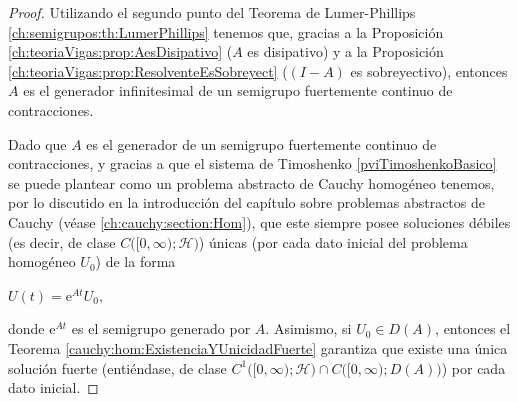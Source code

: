 \begin{proof}
    Utilizando el segundo punto del Teorema de Lumer-Phillips \ref{ch:semigrupos:th:LumerPhillips} tenemos que, gracias a la Proposición \ref{ch:teoriaVigas:prop:AesDisipativo} ($A$ es disipativo) y a la Proposición \ref{ch:teoriaVigas:prop:ResolventeEsSobreyect} ($(I-A)$ es sobreyectivo), entonces $A$ es el generador infinitesimal de un semigrupo fuertemente continuo de contracciones.

    Dado que $A$ es el generador de un semigrupo fuertemente continuo de contracciones, y gracias a que el sistema de Timoshenko \eqref{pviTimoshenkoBasico} se puede plantear como un problema abstracto de Cauchy homogéneo tenemos, por lo discutido en la introducción del capítulo sobre problemas abstractos de Cauchy (véase \ref{ch:cauchy:section:Hom}), que este siempre posee soluciones débiles (es decir, de clase $C\big([0,\infty);\mathcal{H}\big)$) únicas (por cada dato inicial del problema homogéneo $U_0$) de la forma 

    $U(t) = \mathrm{e}^{At}U_0,$

    donde $\mathrm{e}^{At}$ es el semigrupo generado por $A$. Asimismo, si $U_0 \in D(A)$, entonces el Teorema \ref{cauchy:hom:ExistenciaYUnicidadFuerte} garantiza que existe una única solución fuerte (entiéndase, de clase $C^1\big([0,\infty);\mathcal{H}\big) \cap C\big([0,\infty) ; D(A)\big)$) por cada dato inicial. 
\end{proof}